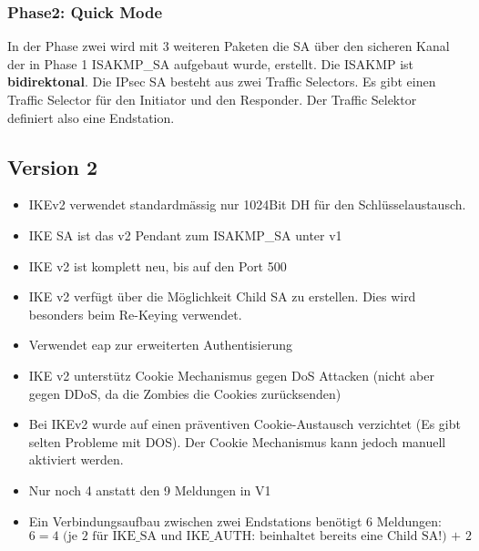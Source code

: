 \subsubsection{Phase2: Quick Mode}
In der Phase zwei wird mit 3 weiteren Paketen die SA über den sicheren Kanal der in Phase 1 ISAKMP\_SA aufgebaut wurde, erstellt. Die ISAKMP ist \textbf{bidirektonal}. Die IPsec SA besteht aus zwei Traffic Selectors. Es gibt einen Traffic Selector für den Initiator und den Responder. Der Traffic Selektor definiert also eine Endstation. 

\clearpage

\subsection{Version 2}
\begin{itemize}
	\item IKEv2 verwendet standardmässig nur 1024Bit DH für den Schlüsselaustausch. 
	\item IKE SA ist das v2 Pendant zum ISAKMP\_SA unter v1
	\item IKE v2 ist komplett neu, bis auf den Port 500
	\item IKE v2 verfügt über die Möglichkeit Child SA zu erstellen. Dies wird besonders beim Re-Keying verwendet.
	\item Verwendet \gls{eap} zur erweiterten Authentisierung
	\item IKE v2 unterstütz Cookie Mechanismus gegen DoS Attacken (nicht aber gegen DDoS, da die Zombies die Cookies zurücksenden)
	\item Bei IKEv2 wurde auf einen präventiven Cookie-Austausch verzichtet (Es gibt selten Probleme mit DOS). Der Cookie Mechanismus kann jedoch manuell aktiviert werden. 
	\item Nur noch 4 anstatt den 9 Meldungen in V1
	\item Ein Verbindungsaufbau zwischen zwei Endstations benötigt 6 Meldungen:
	\[
	6 = \text{4 (je 2 für IKE\_SA und IKE\_AUTH: beinhaltet bereits eine Child SA!) + 2 (Child SA)}
	\]
\end{itemize}


